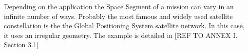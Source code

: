 Depending on the application the Space Segment of a mission can vary in an infinite number of ways. Probably the most famous and widely used satellite constellation is the the Global Positioning System satellite network. In this case, it uses an irregular geometry. The example is detailed in [{REF TO ANNEX I. Section 3.1}]
\\